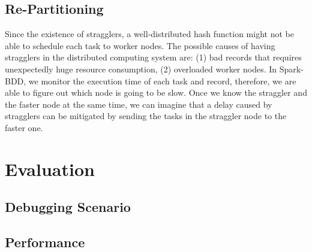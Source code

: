 \documentclass{acm_proc_article-sp}
\begin{document}
\subsection{Re-Partitioning}

Since the existence of stragglers, a well-distributed hash function might not be able to schedule each task to worker nodes. The possible causes of having stragglers in the distributed computing system are: (1) bad records that requires unexpectedly huge resource consumption, (2) overloaded worker nodes. In Spark-BDD, we monitor the execution time of each task and record, therefore, we are able to figure out which node is going to be slow. Once we know the straggler and the faster node at the same time, we can imagine that a delay caused by stragglers can be mitigated by sending the tasks in the straggler node to the faster one. 

\section{Evaluation}
\subsection{Debugging Scenario}


\subsection{Performance}
\end{document}
